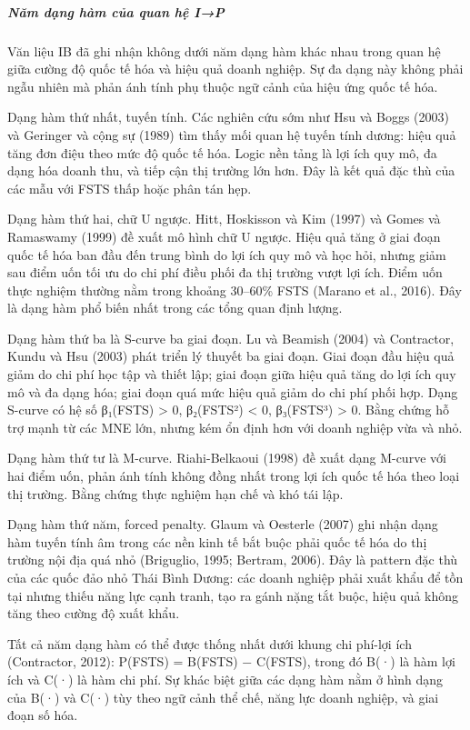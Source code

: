 \documentclass[12pt,a4paper]{article}
\begin{document}
\hypertarget{nux103m-dux1ea1ng-huxe0m-cux1ee7a-quan-hux1ec7-ip}{%
\subparagraph{Năm dạng hàm của quan hệ
I→P}\label{nux103m-dux1ea1ng-huxe0m-cux1ee7a-quan-hux1ec7-ip}}

Văn liệu IB đã ghi nhận không dưới năm dạng hàm khác nhau trong quan hệ
giữa cường độ quốc tế hóa và hiệu quả doanh nghiệp. Sự đa dạng này không
phải ngẫu nhiên mà phản ánh tính phụ thuộc ngữ cảnh của hiệu ứng quốc tế
hóa.

Dạng hàm thứ nhất, tuyến tính. Các nghiên cứu sớm như Hsu và Boggs
(2003) và Geringer và cộng sự (1989) tìm thấy mối quan hệ tuyến tính
dương: hiệu quả tăng đơn điệu theo mức độ quốc tế hóa. Logic nền tảng là
lợi ích quy mô, đa dạng hóa doanh thu, và tiếp cận thị trường lớn hơn.
Đây là kết quả đặc thù của các mẫu với FSTS thấp hoặc phân tán hẹp.

Dạng hàm thứ hai, chữ U ngược. Hitt, Hoskisson và Kim (1997) và Gomes và
Ramaswamy (1999) đề xuất mô hình chữ U ngược. Hiệu quả tăng ở giai đoạn
quốc tế hóa ban đầu đến trung bình do lợi ích quy mô và học hỏi, nhưng
giảm sau điểm uốn tối ưu do chi phí điều phối đa thị trường vượt lợi
ích. Điểm uốn thực nghiệm thường nằm trong khoảng 30--60\% FSTS (Marano
et al., 2016). Đây là dạng hàm phổ biến nhất trong các tổng quan định
lượng.

Dạng hàm thứ ba là S-curve ba giai đoạn. Lu và Beamish (2004) và
Contractor, Kundu và Hsu (2003) phát triển lý thuyết ba giai đoạn. Giai
đoạn đầu hiệu quả giảm do chi phí học tập và thiết lập; giai đoạn giữa
hiệu quả tăng do lợi ích quy mô và đa dạng hóa; giai đoạn quá mức hiệu
quả giảm do chi phí phối hợp. Dạng S-curve có hệ số β₁(FSTS)
\textgreater{} 0, β₂(FSTS²) \textless{} 0, β₃(FSTS³) \textgreater{} 0.
Bằng chứng hỗ trợ mạnh từ các MNE lớn, nhưng kém ổn định hơn với doanh
nghiệp vừa và nhỏ.

Dạng hàm thứ tư là M-curve. Riahi-Belkaoui (1998) đề xuất dạng M-curve
với hai điểm uốn, phản ánh tính không đồng nhất trong lợi ích quốc tế
hóa theo loại thị trường. Bằng chứng thực nghiệm hạn chế và khó tái lập.

Dạng hàm thứ năm, forced penalty. Glaum và Oesterle (2007) ghi nhận dạng
hàm tuyến tính âm trong các nền kinh tế bắt buộc phải quốc tế hóa do thị
trường nội địa quá nhỏ (Briguglio, 1995; Bertram, 2006). Đây là pattern
đặc thù của các quốc đảo nhỏ Thái Bình Dương: các doanh nghiệp phải xuất
khẩu để tồn tại nhưng thiếu năng lực cạnh tranh, tạo ra gánh nặng tắt
buộc, hiệu quả không tăng theo cường độ xuất khẩu.

Tất cả năm dạng hàm có thể được thống nhất dưới khung chi phí-lợi ích
(Contractor, 2012): P(FSTS) = B(FSTS) − C(FSTS), trong đó B(·) là hàm
lợi ích và C(·) là hàm chi phí. Sự khác biệt giữa các dạng hàm nằm ở
hình dạng của B(·) và C(·) tùy theo ngữ cảnh thể chế, năng lực doanh
nghiệp, và giai đoạn số hóa.
\end{document}
